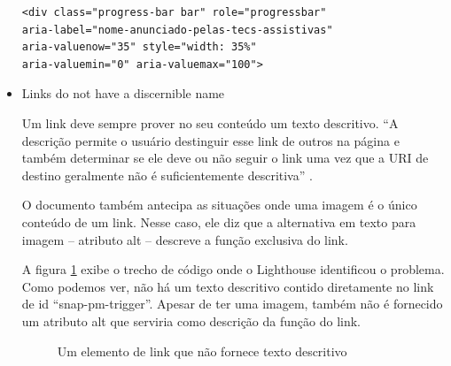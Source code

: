 \documentclass[
	12pt,				%
	openright,			%
	oneside,			%
	a4paper,			%
	chapter=TITLE,		%
	section=TITLE,		%
	subsection=TITLE,	%
	subsubsection=TITLE,%
	english,			%
	brazil				%
	]{abntex2}
\theoremstyle{definition}
\begin{document}
\begin{itemize}
\begin{center}
\begin{minipage}{10cm}
\begin{verbatim}
<div class="progress-bar bar" role="progressbar" 
aria-label="nome-anunciado-pelas-tecs-assistivas" 
aria-valuenow="35" style="width: 35%" 
aria-valuemin="0" aria-valuemax="100">
\end{verbatim}
\end{minipage}
\end{center}

 \item Links do not have a discernible name
   
Um link deve sempre prover no seu conteúdo um texto descritivo. “A descrição permite o usuário destinguir esse link de outros na página e também determinar se ele deve ou não seguir o link uma vez que a URI de destino geralmente não é suficientemente descritiva” \cite{cooper2010techniques}.

O documento também antecipa as situações onde uma imagem é o único conteúdo de um link. Nesse caso, ele diz que a alternativa em texto para imagem – atributo alt – descreve a função exclusiva do link.

A figura \ref{Um elemento de link que não fornece texto descritivo} exibe o trecho de código onde o Lighthouse identificou o problema. Como podemos ver, não há um texto descritivo contido diretamente no link de id “snap-pm-trigger”. Apesar de ter uma imagem, também não é fornecido um  atributo alt que serviria como descrição da função do link.

\begin{figure}[!h]
\centering
\caption{Um elemento de link que não fornece texto descritivo}
\label{Um elemento de link que não fornece texto descritivo}
\end{figure}


\end{itemize}
\end{document}

